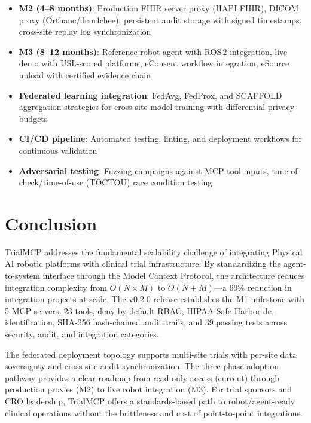 \documentclass[10pt,letterpaper]{article}
\begin{document}
\begin{itemize}[leftmargin=2em]
    \item \textbf{M2 (4--8 months)}: Production FHIR server proxy (HAPI FHIR), DICOM proxy (Orthanc/dcm4chee), persistent audit storage with signed timestamps, cross-site replay log synchronization
    \item \textbf{M3 (8--12 months)}: Reference robot agent with ROS\,2 integration, live demo with USL-scored platforms, eConsent workflow integration, eSource upload with certified evidence chain
    \item \textbf{Federated learning integration}: FedAvg, FedProx, and SCAFFOLD aggregation strategies for cross-site model training with differential privacy budgets \cite{kawchak2026fl}
    \item \textbf{CI/CD pipeline}: Automated testing, linting, and deployment workflows for continuous validation
    \item \textbf{Adversarial testing}: Fuzzing campaigns against MCP tool inputs, time-of-check/time-of-use (TOCTOU) race condition testing
\end{itemize}

\section{Conclusion}

TrialMCP addresses the fundamental scalability challenge of integrating Physical AI robotic platforms with clinical trial infrastructure. By standardizing the agent-to-system interface through the Model Context Protocol, the architecture reduces integration complexity from $O(N \times M)$ to $O(N + M)$---a 69\% reduction in integration projects at scale. The v0.2.0 release establishes the M1 milestone with 5 MCP servers, 23 tools, deny-by-default RBAC, HIPAA Safe Harbor de-identification, SHA-256 hash-chained audit trails, and 39 passing tests across security, audit, and integration categories.

The federated deployment topology supports multi-site trials with per-site data sovereignty and cross-site audit synchronization. The three-phase adoption pathway provides a clear roadmap from read-only access (current) through production proxies (M2) to live robot integration (M3). For trial sponsors and CRO leadership, TrialMCP offers a standards-based path to robot/agent-ready clinical operations without the brittleness and cost of point-to-point integrations.
\end{document}
